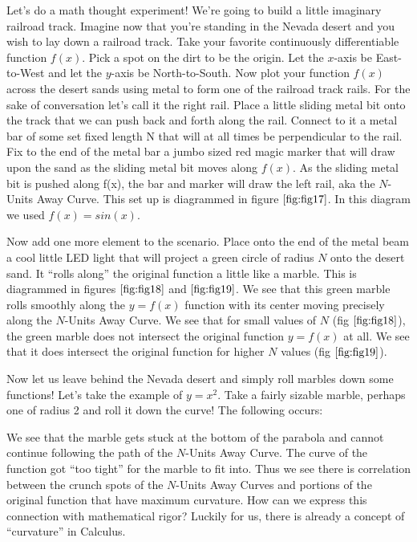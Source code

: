 Let’s do a math thought experiment! We’re going to build a little imaginary railroad track. Imagine now that you’re standing in the Nevada desert and you wish to lay down a railroad track. Take your favorite continuously differentiable function $f(x)$. Pick a spot on the dirt to be the origin. Let the $x$-axis be East-to-West and let the $y$-axis be North-to-South. Now plot your function $f(x)$ across the desert sands using metal to form one of the railroad track rails. For the sake of
conversation let’s call it the right rail. Place a little sliding metal bit onto the track that we can push back and forth along the rail. Connect to it a metal bar of some set fixed length N that will at all times be perpendicular to the rail. Fix to the end of the metal bar a jumbo sized red magic marker that will draw upon the sand as the sliding metal bit moves along $f(x)$. As the sliding metal bit is pushed along f(x), the bar and marker will draw the left rail, aka the $N$-Units Away Curve. This set up is diagrammed in figure $\ref{fig:fig17}$. In this diagram we used $f(x) = sin(x)$.

Now add one more element to the scenario. Place onto the end of the metal beam a cool little LED light that will project a green circle of radius $N$ onto the desert sand. It ``rolls along'' the original function a little like a marble. This is diagrammed in figures $\ref{fig:fig18}$ and $\ref{fig:fig19}$. We see that this green marble rolls smoothly along the $y=f(x)$ function with its center moving precisely along the $N$-Units Away Curve. We see that for
small values of $N$ (fig $\ref{fig:fig18}$), the green marble does not intersect the original function $y=f(x)$ at all. We see that it does intersect the original function for higher $N$ values (fig $\ref{fig:fig19}$).

Now let us leave behind the Nevada desert and simply roll marbles down some functions! Let’s take the example of $y=x^2$. Take a fairly sizable marble, perhaps one of radius 2 and roll it down the curve! The following occurs:

We see that the marble gets stuck at the bottom of the parabola and cannot continue following the path of the $N$-Units Away Curve. The curve of the function got ``too tight'' for the marble to fit into. Thus we see there is correlation between the crunch spots of the $N$-Units Away Curves and portions of the original function that have maximum curvature. How can we express this connection with mathematical rigor? Luckily for us, there is already a concept of ``curvature'' in Calculus. 

